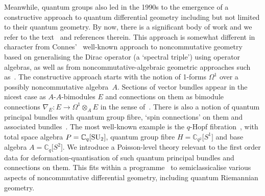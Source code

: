 \documentclass[10pt,a4paper]{amsart}
\numberwithin{equation}{section}
\newcommand{\C}{{\mathbb{C}}}
\newcommand{\<}{{\langle}}
\renewcommand{\>}{{\rangle}}
\newcommand{\tens}{\otimes}
\begin{document}
Meanwhile, quantum groups also led in the 1990s to the emergence of a constructive approach to quantum differential geometry including but not limited to their quantum geometry. By now, there is a significant body of work and we refer to the text~\cite{BegMa} and references therein. This approach is somewhat different in character from Connes'~\cite{Con} well-known approach to noncommutative geometry based on generalising the Dirac operator (a `spectral triple') using operator algebras, as well as from noncommutative-algebraic geometric approaches such as~\cite{SvdB}. The constructive approach starts with the notion of 1-forms $\Omega^1$ over a possibly noncommutative algebra~$A$. Sections of vector bundles appear in the nicest case as $A$-$A$-bimodules $E$ and connections on them as bimodule connections $\nabla_E\colon E\to \Omega^1\tens_A E$ in the sense of~\cite{DVM,Mou}. There is also a notion of quantum principal bundles with quantum group fibre, `spin connections' on them and associated bundles~\cite{BrzMa}. The most well-known example is the $q$-Hopf fibration~\cite{BegMa, BrzMa,HajMa,Ma:spin}, with total space algebra $P=\C_q[{\rm SU}_2]$, quantum group fibre $H=\C_{q^2}\big[S^1\big]$ and base algebra $A=\C_q\big[S^2\big]$. We introduce a Poisson-level theory relevant to the first order data for deformation-quantisation of such quantum principal bundles and connections on them. This fits within a programme~\cite{BegMa:sem, BegMa:prg, FriMa,MaTao:plg} to semiclassicalise various aspects of noncommutative differential geometry, including quantum Riemannian geometry.
\end{document}
